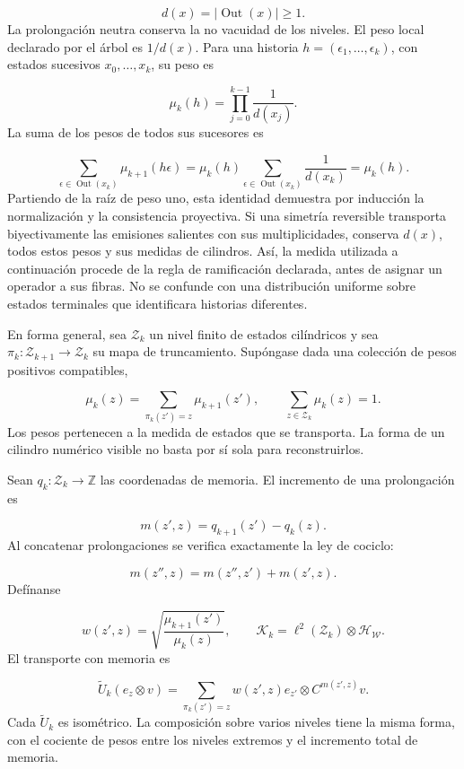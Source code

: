 \[
d(x)=|\operatorname{Out}(x)|\geq1.
\]
La prolongación neutra conserva la no vacuidad de los niveles. El peso local declarado por el árbol es \(1/d(x)\). Para una historia \(h=(\epsilon_1,\ldots,\epsilon_k)\), con estados sucesivos \(x_0,\ldots,x_k\), su peso es

\[
\mu_k(h)=\prod_{j=0}^{k-1}\frac1{d(x_j)}.
\]
La suma de los pesos de todos sus sucesores es

\[
\sum_{\epsilon\in\operatorname{Out}(x_k)}
\mu_{k+1}(h\epsilon)
=\mu_k(h)\sum_{\epsilon\in\operatorname{Out}(x_k)}\frac1{d(x_k)}
=\mu_k(h).
\]
Partiendo de la raíz de peso uno, esta identidad demuestra por inducción la normalización y la consistencia proyectiva. Si una simetría reversible transporta biyectivamente las emisiones salientes con sus multiplicidades, conserva \(d(x)\), todos estos pesos y sus medidas de cilindros. Así, la medida utilizada a continuación procede de la regla de ramificación declarada, antes de asignar un operador a sus fibras. No se confunde con una distribución uniforme sobre estados terminales que identificara historias diferentes.

En forma general, sea \(\mathcal Z_k\) un nivel finito de estados cilíndricos y sea \(\pi_k:\mathcal Z_{k+1}\to\mathcal Z_k\) su mapa de truncamiento. Supóngase dada una colección de pesos positivos compatibles,

\[
\mu_k(z)=\sum_{\pi_k(z')=z}\mu_{k+1}(z'),
\qquad \sum_{z\in\mathcal Z_k}\mu_k(z)=1.
\]
Los pesos pertenecen a la medida de estados que se transporta. La forma de un cilindro numérico visible no basta por sí sola para reconstruirlos.

Sean \(q_k:\mathcal Z_k\to\mathbb Z\) las coordenadas de memoria. El incremento de una prolongación es

\[
m(z',z)=q_{k+1}(z')-q_k(z).
\]
Al concatenar prolongaciones se verifica exactamente la ley de cociclo:

\[
m(z'',z)=m(z'',z')+m(z',z).
\]
Defínanse

\[
w(z',z)=
\sqrt{\frac{\mu_{k+1}(z')}{\mu_k(z)}},
\qquad
\mathcal K_k=\ell^2(\mathcal Z_k)\otimes\mathcal H_{\mathscr W}.
\]
El transporte con memoria es

\[
\widetilde U_k(e_z\otimes v)
=\sum_{\pi_k(z')=z}w(z',z)e_{z'}\otimes C^{m(z',z)}v.
\]
Cada \(\widetilde U_k\) es isométrico. La composición sobre varios niveles tiene la misma forma, con el cociente de pesos entre los niveles extremos y el incremento total de memoria.

